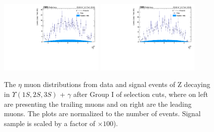 \begin{figure}[!htbp]
\begin{center}
\includegraphics[width=0.45\textwidth]{figures/outputPlots/ZtoUpsilon_Cat0_ZZZZZ/nEvts/data_x_mc/withKinCuts/h_withKin_TrailingMu_eta}\hspace*{1.cm}
\includegraphics[width=0.45\textwidth]{figures/outputPlots/ZtoUpsilon_Cat0_ZZZZZ/nEvts/data_x_mc/withKinCuts/h_withKin_LeadingMu_eta}
\end{center}\vspace*{-.5cm}
\caption{The $\eta$ muon distributions from data and signal events of Z decaying in $\Upsilon(1S,2S,3S)$ + $\gamma$ after Group I of selection cuts, where on left are presenting the trailing muons and on right are the leading muons. The plots are normalized to the number of events. Signal sample is scaled by a factor of $\times 100$).}
\label{fig:etaMuons_ZtoUpsilon_Cat0_groupI_plus_II}
\end{figure}

